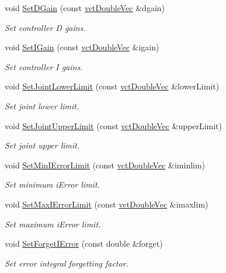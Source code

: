 \begin{DoxyCompactItemize}
void \hyperlink{classmts_p_i_d_afadd530f96fa2d69c8140482680f3b61}{Set\-D\-Gain} (const \hyperlink{vct_dynamic_vector_types_8h_ade4b3068c86fb88f41af2e5187e491c2}{vct\-Double\-Vec} \&dgain)
\begin{DoxyCompactList}\small\item\em Set controller D gains. \end{DoxyCompactList}\item 
void \hyperlink{classmts_p_i_d_a286f0cdbc59708eac21f8635105f0dd0}{Set\-I\-Gain} (const \hyperlink{vct_dynamic_vector_types_8h_ade4b3068c86fb88f41af2e5187e491c2}{vct\-Double\-Vec} \&igain)
\begin{DoxyCompactList}\small\item\em Set controller I gains. \end{DoxyCompactList}\item 
void \hyperlink{classmts_p_i_d_a15bba897773af7b17971ddbddfa4c8f4}{Set\-Joint\-Lower\-Limit} (const \hyperlink{vct_dynamic_vector_types_8h_ade4b3068c86fb88f41af2e5187e491c2}{vct\-Double\-Vec} \&lower\-Limit)
\begin{DoxyCompactList}\small\item\em Set joint lower limit. \end{DoxyCompactList}\item 
void \hyperlink{classmts_p_i_d_abfb71b1931f3664e87729f2e2b22be55}{Set\-Joint\-Upper\-Limit} (const \hyperlink{vct_dynamic_vector_types_8h_ade4b3068c86fb88f41af2e5187e491c2}{vct\-Double\-Vec} \&upper\-Limit)
\begin{DoxyCompactList}\small\item\em Set joint upper limit. \end{DoxyCompactList}\item 
void \hyperlink{classmts_p_i_d_a93201139fc34fbcb71046ed27e618d34}{Set\-Min\-I\-Error\-Limit} (const \hyperlink{vct_dynamic_vector_types_8h_ade4b3068c86fb88f41af2e5187e491c2}{vct\-Double\-Vec} \&iminlim)
\begin{DoxyCompactList}\small\item\em Set minimum i\-Error limit. \end{DoxyCompactList}\item 
void \hyperlink{classmts_p_i_d_a742fd6c148873f962b28661fb448b81d}{Set\-Max\-I\-Error\-Limit} (const \hyperlink{vct_dynamic_vector_types_8h_ade4b3068c86fb88f41af2e5187e491c2}{vct\-Double\-Vec} \&imaxlim)
\begin{DoxyCompactList}\small\item\em Set maximum i\-Error limit. \end{DoxyCompactList}\item 
void \hyperlink{classmts_p_i_d_a1fd0c497970ebd8f20147e7087abccc1}{Set\-Forget\-I\-Error} (const double \&forget)
\begin{DoxyCompactList}\small\item\em Set error integral forgetting factor. \end{DoxyCompactList}\end{DoxyCompactItemize}

